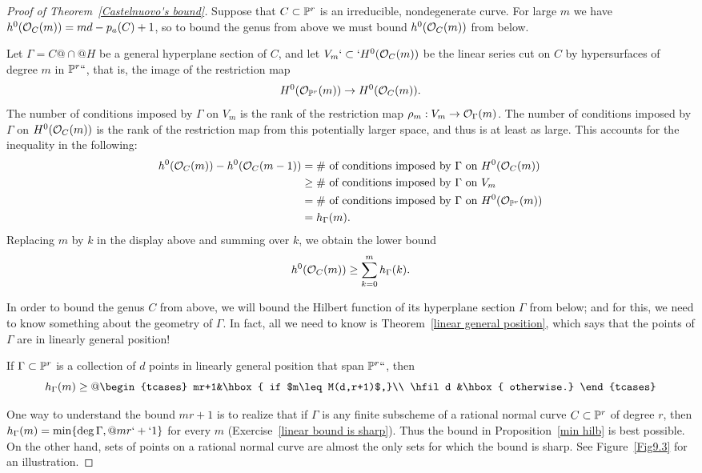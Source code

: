 \begin{proof}[Proof of Theorem~\ref{Castelnuovo's bound}]
Suppose that $C \subset {\mathbb P}^r$ is an irreducible, nondegenerate curve. For
large $m$ we have
$h^{0}({\mathcal O}_{C}(m)) = md-p_{a}(C) +1$, so to bound the genus from above
we must
bound $h^{0}({\mathcal O}_{C}(m))$ from below.

Let $\Gamma = C@\cap@H$ be a general hyperplane section of $C$, and
let $V_m`\subset`H^0({\mathcal O}_C(m))$ be the linear series cut on $C$ by
hypersurfaces of degree $m$ in ${\mathbb P}^r` `$, that is, the image of the
restriction map
$$
H^0({\mathcal O}_{{\mathbb P}^r}(m)) \to H^0({\mathcal O}_C(m)).
$$
The number of  conditions imposed by $\Gamma$ on $V_m$ is the rank of
the restriction map
$\rho_m: V_m \to {\mathcal O}_\Gamma(m)$.
 The number of conditions imposed by $\Gamma$ on $H^{0}({\mathcal O}_{C}(m))$
 is the
 rank of the restriction map from this potentially larger space, and
 thus is at least as large. This
 accounts for the inequality in the following:
{\advance\jot-2pt
\begin{align*}
h^0({\mathcal O}_C(m)) - h^0({\mathcal O}_C(m-1)) & = \text{\# of conditions imposed by
$\Gamma$ on $H^0({\mathcal O}_C(m))$}\\
&\geq \text{\# of conditions imposed by $\Gamma$ on $V_m$} \\
&= \text{\# of conditions imposed by $\Gamma$ on $H^0({\mathcal O}_{{\mathbb P}^r}(m))$} \\
&= h_\Gamma(m).
\end{align*}}%
Replacing $m$ by $k$ in the display above and summing
over $k$, we obtain the lower bound
$$
h^0({\mathcal O}_C(m)) \geq \sum_{k=0}^m h_\Gamma(k).
$$

In order to bound the genus $C$ from above, we will bound the Hilbert
function of its hyperplane section $\Gamma$  from below; and for this,
we need to know something about the geometry of $\Gamma$. In fact, all
we need to know is Theorem~\ref{linear general position}, which says
that the points of $\Gamma$ are in 
linearly general position!
%

\begin{proposition}\label{min hilb}
If $\Gamma \subset {\mathbb P}^r$ is a collection of $d$ points in linearly
general position that span ${\mathbb P}^r` `$, then
$$
h_\Gamma(m) \geq
@
\begin{tcases}
mr+1&\hbox{ if $m\leq M(d,r+1)$,}\\
\hfil d &\hbox{ otherwise.}
\end{tcases}
$$
\end{proposition}

One way to understand the bound $mr+1$ is to realize that if $\Gamma$
is any finite subscheme of a rational normal curve $C\subset{\mathbb P}^r$
of degree $r$,
then $h_\Gamma(m) = \min\{\deg \Gamma,@ mr`+`1\}$ for every $m$
(Exercise~\ref{linear bound is sharp}).
  Thus the bound in Proposition~\ref{min hilb} is best possible.
On the other hand, sets of points on a rational normal curve are almost
the only sets for which the bound is sharp. See Figure~\ref{Fig9.3}
for an illustration.


\end{proof}
